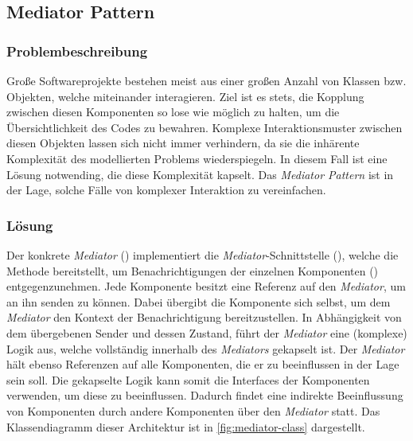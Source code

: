 \subsection{Mediator Pattern}


\subsubsection*{Problembeschreibung}

Große Softwareprojekte bestehen meist aus einer großen Anzahl von Klassen bzw. Objekten, welche miteinander interagieren. Ziel ist es stets, die Kopplung zwischen diesen Komponenten so lose wie möglich zu halten, um die Übersichtlichkeit des Codes zu bewahren. Komplexe Interaktionsmuster zwischen diesen Objekten lassen sich nicht immer verhindern, da sie die inhärente Komplexität des modellierten Problems wiederspiegeln. In diesem Fall ist eine Lösung notwending, die diese Komplexität kapselt. Das \emph{Mediator Pattern} ist in der Lage, solche Fälle von komplexer Interaktion zu vereinfachen. \cite{gamma_design_1995}

\subsubsection*{Lösung}

Der konkrete \emph{Mediator} () implementiert die \emph{Mediator}-Schnittstelle (), welche die Methode  bereitstellt, um Benachrichtigungen der einzelnen Komponenten () entgegenzunehmen. Jede Komponente besitzt eine Referenz auf den \emph{Mediator}, um  an ihn senden zu können. Dabei übergibt die Komponente sich selbst, um dem \emph{Mediator} den Kontext der Benachrichtigung bereitzustellen. In Abhängigkeit von dem übergebenen Sender und dessen Zustand, führt der \emph{Mediator} eine (komplexe) Logik aus, welche vollständig innerhalb des \emph{Mediators} gekapselt ist. Der \emph{Mediator} hält ebenso Referenzen auf alle Komponenten, die er zu beeinflussen in der Lage sein soll. Die gekapselte Logik kann somit die Interfaces der Komponenten verwenden, um diese zu beeinflussen. Dadurch findet eine indirekte Beeinflussung von Komponenten durch andere Komponenten über den \emph{Mediator} statt. Das Klassendiagramm dieser Architektur ist in \autoref{fig:mediator-class} dargestellt.

